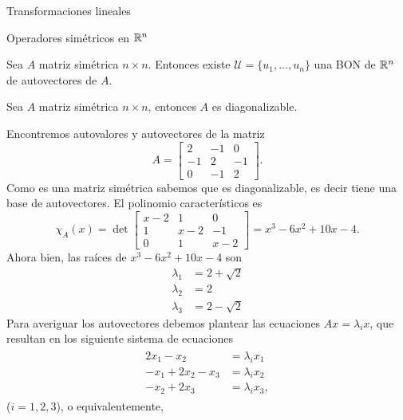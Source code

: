 \begin{chapter}{Transformaciones lineales}
\begin{section}{Operadores simétricos en $\mathbb R^n$}
    \begin{teorema} Sea $A$ matriz simétrica $n \times n$. Entonces existe $\mathcal{U} = \{u_1,\ldots,u_n\}$ una BON de $\mathbb R^n$ de autovectores de $A$.
    \end{teorema}


    \begin{corolario}
         Sea $A$ matriz simétrica $n \times n$, entonces $A$ es diagonalizable.
    \end{corolario}


    \begin{ejemplo*} Encontremos autovalores y autovectores de  la matriz
        \begin{equation*}
            A = \begin{bmatrix} 2&-1&0\\-1&2&-1\\0&-1&2 \end{bmatrix}.
        \end{equation*}
        Como es una matriz simétrica sabemos que es diagonalizable, es decir tiene una base de autovectores. 
        El polinomio característicos es
        \begin{equation*}
            \chi_A(x) = \det  \begin{bmatrix} x-2&1&0\\1&x-2&-1\\0&1&x-2 \end{bmatrix} =	x^3 - 6 x^2 + 10 x - 4.
        \end{equation*}
        Ahora bien, las raíces de $x^3 - 6 x^2 + 10 x - 4$  son 
        \begin{align*}
            \lambda_1 &= 2 + \sqrt 2 \\
            \lambda_2 &= 2 \\
            \lambda_3 &= 2 - \sqrt 2
        \end{align*}
        Para averiguar los autovectores debemos plantear las ecuaciones $Ax = \lambda_ix$,  que resultan en los siguiente sistema de ecuaciones
        \begin{align*}
        \begin{split}
        2x_1 - x_2  &= \lambda_i x_1 \\
        -x_1 + 2x_2 -x_3 &=\lambda_ix_2 \\
        -x_2 + 2x_3 &= \lambda_ix_3,  
        \end{split}
        \end{align*}
        ($i=1,2,3$),  o equivalentemente,

\end{ejemplo*}
\end{section}
\end{chapter}
